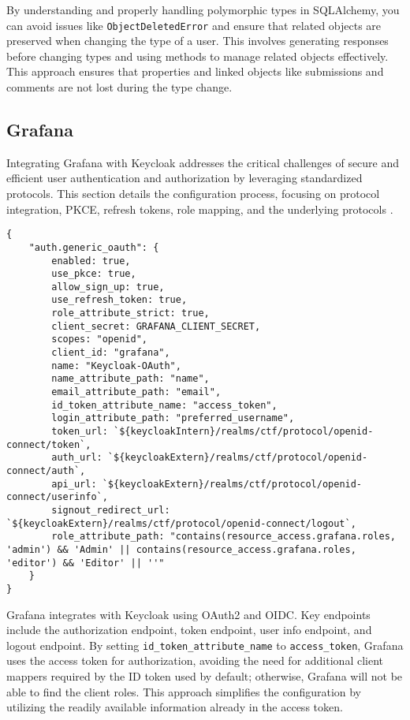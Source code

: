 By understanding and properly handling polymorphic types in SQLAlchemy, you can avoid issues like \texttt{ObjectDeletedError} and ensure that related objects are preserved when changing the type of a user. This involves generating responses before changing types and using methods to manage related objects effectively. This approach ensures that properties and linked objects like submissions and comments are not lost during the type change.

\subsection{Grafana}\label{sec:grafana_auth}
Integrating Grafana with Keycloak addresses the critical challenges of secure and efficient user authentication and authorization by leveraging standardized protocols. This section details the configuration process, focusing on protocol integration, PKCE, refresh tokens, role mapping, and the underlying protocols \parencite{GrafanaKeycloak}.

\begin{verbatim}
{
    "auth.generic_oauth": {
        enabled: true,
        use_pkce: true,
        allow_sign_up: true,
        use_refresh_token: true,
        role_attribute_strict: true,
        client_secret: GRAFANA_CLIENT_SECRET,
        scopes: "openid",
        client_id: "grafana",
        name: "Keycloak-OAuth",
        name_attribute_path: "name",
        email_attribute_path: "email",
        id_token_attribute_name: "access_token",
        login_attribute_path: "preferred_username",
        token_url: `${keycloakIntern}/realms/ctf/protocol/openid-connect/token`,
        auth_url: `${keycloakExtern}/realms/ctf/protocol/openid-connect/auth`,
        api_url: `${keycloakExtern}/realms/ctf/protocol/openid-connect/userinfo`,
        signout_redirect_url: `${keycloakExtern}/realms/ctf/protocol/openid-connect/logout`,
        role_attribute_path: "contains(resource_access.grafana.roles, 'admin') && 'Admin' || contains(resource_access.grafana.roles, 'editor') && 'Editor' || ''"
    }
}
\end{verbatim}

Grafana integrates with Keycloak using OAuth2 and OIDC. Key endpoints include the authorization endpoint, token endpoint, user info endpoint, and logout endpoint. By setting \texttt{id\_token\_attribute\_name} to \texttt{access\_token}, Grafana uses the access token for authorization, avoiding the need for additional client mappers required by the ID token used by default; otherwise, Grafana will not be able to find the client roles. This approach simplifies the configuration by utilizing the readily available information already in the access token.

